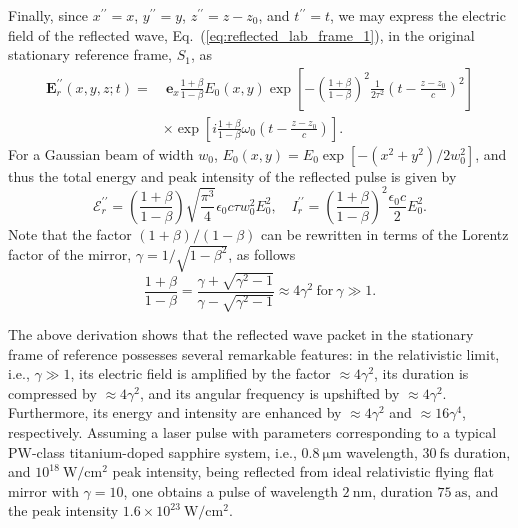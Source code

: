 \documentclass[10pt, a4paper, twoside, openright]{report}
\renewcommand{\vec}[1]{\mathbf{#1}}
\begin{document}
Finally, since $ x^{\prime \prime} = x $, $ y^{\prime \prime} = y $, $ z^{\prime \prime} = z - z_0 $, and $ t^{\prime \prime} = t $,
we may express the electric field of the reflected wave, Eq.~(\ref{eq:reflected_lab_frame_1}), in the original stationary reference frame, $ S_1 $, as
\begin{equation}\label{eq:reflected_lab_frame_2}
\begin{split}
\vec{E}^{\prime \prime}_r \left(x, y, z; t \right) = & \ \vec{e}_x \frac{1 + \beta}{1 - \beta} E_0 \left(x, y \right) \exp \left[ - \left(\frac{1 + \beta}{1 - \beta}\right)^2 \frac{1}{2 \tau^2} \left(t - \frac{z - z_0}{c}\right)^2 \right] \\ 
& \times \exp \left[ i \frac{1 + \beta}{1 - \beta} \omega_0 \left(t - \frac{z - z_0}{c}\right) \right].
\end{split}
\end{equation}
For a Gaussian beam of width $ w_0 $, $ E_0 \left( x, y \right) = E_0 \exp \left[-\left( x^2 + y^2 \right) / 2 w_0^2 \right] $, and thus the total energy and peak intensity of the reflected pulse is given by 
\begin{equation}\label{eq:energy_and_intensity}
\mathcal{E}^{\prime \prime}_r = \left(\frac{1 + \beta}{1 - \beta}\right) \sqrt{\frac{\pi^3}{4}} \epsilon_0 c \tau w_0^2 E_0^2 , \quad I^{\prime \prime}_r = \left(\frac{1 + \beta}{1 - \beta}\right)^2 \frac{\epsilon_0 c}{2} E_0^2.
\end{equation}
Note that the factor $ \left(1 + \beta \right) / \left(1 - \beta \right) $ can be rewritten in terms of the Lorentz factor of the mirror, $ \gamma = 1 / \sqrt{1 - \beta^2} $, as follows
\begin{equation}\label{eq:factor}
\frac{1 + \beta}{1 - \beta} = \frac{\gamma + \sqrt{\gamma^2 - 1}}{\gamma - \sqrt{\gamma^2 - 1}} \approx 4 \gamma^2 \ \mathrm{for} \ \gamma \gg 1.
\end{equation}

The above derivation shows that the reflected wave packet in the stationary frame of reference possesses several remarkable features: in the relativistic limit, i.e., $ \gamma \gg 1 $, its electric field is amplified by the factor $ \approx 4 \gamma^2 $, its duration is compressed by $ \approx 4 \gamma^2 $, and its angular frequency is upshifted by $ \approx 4 \gamma^2 $. Furthermore, its energy and intensity are enhanced by $ \approx 4 \gamma^2 $ and $ \approx 16 \gamma^4 $, respectively. Assuming a laser pulse with parameters corresponding to a typical $ \mathrm{PW} $-class titanium-doped sapphire system, i.e., $ 0.8 \ \mathrm{\mu m} $ wavelength, $ 30 \ \mathrm{fs} $ duration, and $ 10^{18} \ \mathrm{W / cm^2} $ peak intensity, being reflected from ideal relativistic flying flat mirror with $ \gamma = 10 $, one obtains a pulse of wavelength $ 2 \ \mathrm{nm} $, duration $ 75 \ \mathrm{as} $, and the peak intensity $ 1.6 \times 10^{23} \ \mathrm{W / cm^2} $.
\end{document}
